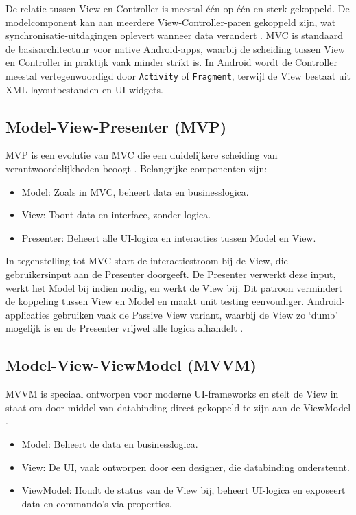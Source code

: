 De relatie tussen View en Controller is meestal één-op-één en sterk gekoppeld. De modelcomponent kan aan meerdere View-Controller-paren gekoppeld zijn, wat synchronisatie-uitdagingen oplevert wanneer data verandert \autocite{Lou2016}. MVC is standaard de basisarchitectuur voor native Android-apps, waarbij de scheiding tussen View en Controller in praktijk vaak minder strikt is. In Android wordt de Controller meestal vertegenwoordigd door \texttt{Activity} of \texttt{Fragment}, terwijl de View bestaat uit XML-layoutbestanden en UI-widgets.

\subsection{Model-View-Presenter (MVP)}
MVP is een evolutie van MVC die een duidelijkere scheiding van verantwoordelijkheden beoogt \autocite{Lou2016}.  
Belangrijke componenten zijn:  
\begin{itemize}
	\item Model: Zoals in MVC, beheert data en businesslogica.  
	\item View: Toont data en interface, zonder logica.  
	\item Presenter: Beheert alle UI-logica en interacties tussen Model en View.  
\end{itemize}

In tegenstelling tot MVC start de interactiestroom bij de View, die gebruikersinput aan de Presenter doorgeeft. De Presenter verwerkt deze input, werkt het Model bij indien nodig, en werkt de View bij. Dit patroon vermindert de koppeling tussen View en Model en maakt unit testing eenvoudiger. Android-applicaties gebruiken vaak de Passive View variant, waarbij de View zo ‘dumb’ mogelijk is en de Presenter vrijwel alle logica afhandelt \autocite{Lou2016}.

\subsection{Model-View-ViewModel (MVVM)}
MVVM is speciaal ontworpen voor moderne UI-frameworks en stelt de View in staat om door middel van databinding direct gekoppeld te zijn aan de ViewModel \autocite{Lou2016}.  
\begin{itemize}
	\item Model: Beheert de data en businesslogica.  
	\item View: De UI, vaak ontworpen door een designer, die databinding ondersteunt.  
	\item ViewModel: Houdt de status van de View bij, beheert UI-logica en exposeert data en commando’s via properties.  
\end{itemize}

